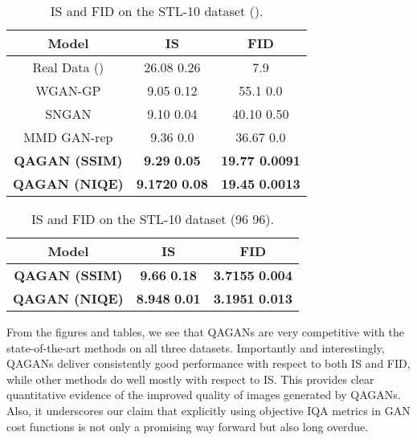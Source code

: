 \documentclass{article}
\begin{document}
\begin{table}[htbp]
\begin{center}
\caption{IS and FID on the STL-10 dataset ().}
 \label{tab:stl1048}
  \begin{tabular}{|c|c|c|}
    \hline
      {\bf{Model}} &
      {\bf{IS}} & {\bf{FID}}\\
      \hline
    Real Data () &  26.08  0.26 & 7.9 \\
      \hline
     WGAN-GP \cite{gulrajani2017improved}  & 9.05 0.12 & 55.1  0.0\\
     
     \hline
     SNGAN \cite{miyato2018spectral} & 9.10  0.04 & 40.10  0.50 \\
      \hline
     MMD GAN-rep \cite{li2017mmd} & 9.36  0.0 & 36.67  0.0 \\
\hline
     \textbf{QAGAN (SSIM)} & \textbf{9.29}  \textbf{0.05} & \textbf{19.77  0.0091}\\
     \hline
     \textbf{QAGAN (NIQE)} & \textbf{9.1720}  \textbf{0.08} & \textbf{19.45}  \textbf{0.0013}\\
    \hline
    \end{tabular}
\end{center}
\end{table}
\begin{table}[htbp] 
\vspace{-0.1cm}
\begin{center}
\caption{IS and FID on the STL-10 dataset (96  96).}
\begin{tabular}{|c|c|c|}
    \hline
      {\bf{Model}} &
      {\bf{IS}} & {\bf{FID}}\\
\hline
    \textbf{QAGAN (SSIM)} & \textbf{9.66}  \textbf{0.18}  & \textbf{3.7155}  \textbf{0.004}\\
    \hline
    \textbf{QAGAN (NIQE)} & \textbf{8.948} \textbf{ 0.01} & \textbf{3.1951}  \textbf{0.013}\\
    \hline
    \end{tabular}
    \label{tab:stl1096}
   \vspace{-4mm}
  \end{center}
  \end{table}




From the figures and tables, we see that QAGANs are very competitive with the state-of-the-art methods on all three datasets. Importantly and interestingly, QAGANs deliver consistently good performance with respect to both IS and FID, while other methods do well mostly with respect to IS. This provides clear quantitative evidence of the improved quality of images generated by QAGANs. Also, it underscores our claim that explicitly using objective IQA metrics in GAN cost functions is not only a promising way forward but also long overdue. 
\end{document}
